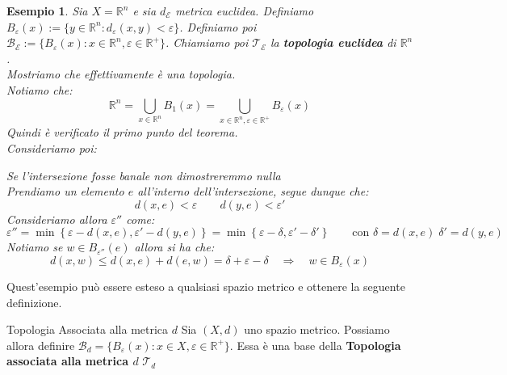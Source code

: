\documentclass[11pt,a4paper,twoside]{article}
\newtheorem{es}{Esempio}
\theoremstyle{definition}
\begin{document}
\begin{es}
	Sia $X = \mathbb R^n$ e sia $d_\mathcal E$ metrica euclidea. Definiamo $B_\varepsilon(x):=\{y \in \mathbb R^n: d_\varepsilon(x,y)<\varepsilon\}$. Definiamo poi $\mathcal B_\mathcal E:=\{B_\varepsilon(x):x \in \mathbb R^n, \varepsilon \in \mathbb R^+\}$. Chiamiamo poi $\mathcal T_\mathcal E$ la \textbf{topologia euclidea} di $\mathbb R^n$.\\
	Mostriamo che effettivamente è una topologia.\\
	Notiamo che:
	\[ \mathbb R^n = \bigcup_{x \in \mathbb R^n}B_1 (x) = \bigcup_{x \in \mathbb R^n, \varepsilon \in \mathbb R^+} B_\varepsilon(x) \]
	Quindi è verificato il primo punto del teorema.\\
	Consideriamo poi:

	\begin{center}
	\end{center}

	\textit{Se l'intersezione fosse banale non dimostreremmo nulla}\\
	Prendiamo un elemento $e$ all'interno dell'intersezione, segue dunque che:
	\[ d(x, e)<\varepsilon \qquad d(y, e)< \varepsilon' \]
	Consideriamo allora $\varepsilon''$ come: \[\varepsilon'' = \min\left\{ {\varepsilon - d(x,e)}, {\varepsilon' - d(y,e)} \right\} = \min\left\{ {\varepsilon - \delta}, {\varepsilon' - \delta'} \right\}\qquad \text{con } \delta=d(x,e)\; \delta'=d(y,e) \]
	Notiamo se $w \in B_{\varepsilon''}(e)$ allora si ha che:
	\[ d(x,w) \leq d(x,e) + d(e,w) = \delta + {\varepsilon -\delta}\quad \Rightarrow \quad w \in B_\varepsilon(x)\]
\end{es}

Quest'esempio può essere esteso a qualsiasi spazio metrico e ottenere la seguente definizione.

\begin{defn}{Topologia Associata alla metrica $d$}{}
	Sia $(X,d)$ uno spazio metrico. Possiamo allora definire $\mathcal B_d = \{B_\varepsilon(x): x \in X, \varepsilon \in \mathbb R^+\}$. Essa è una base della \textbf{Topologia associata alla metrica $d$} $\mathcal T_d$
\end{defn}
\end{document}
